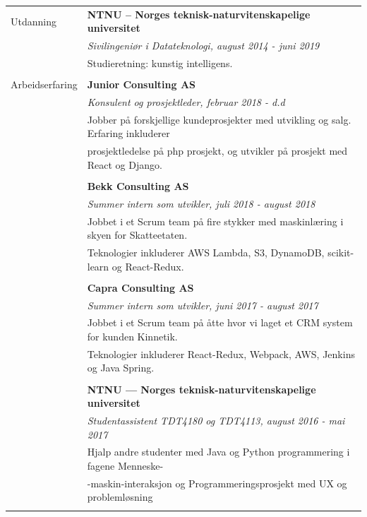 \documentclass[letterpaper,10pt,oneside]{article}
\begin{document}
\noindent \begin{longtable}{@{} l l}
  \Large{Utdanning} & \textbf{NTNU – Norges teknisk-naturvitenskapelige universitet} \\
  & \textit{Sivilingeniør i Datateknologi, august 2014 - juni 2019}\\
     & Studieretning: kunstig intelligens.\\
     & \\
     \Large{Arbeidserfaring} 
     & \textbf{Junior Consulting AS} \\
     & \textit{Konsulent og prosjektleder, februar 2018 - d.d} \\
     & Jobber på forskjellige kundeprosjekter med utvikling og salg. Erfaring inkluderer \\
     & prosjektledelse på php prosjekt, og utvikler på prosjekt med React og Django.\\
     & \\
     & \textbf{Bekk Consulting AS} \\
     & \textit{Summer intern som utvikler, juli 2018 - august 2018} \\
     & Jobbet i et Scrum team på fire stykker med maskinlæring i skyen for Skatteetaten.\\
     & Teknologier inkluderer AWS Lambda, S3, DynamoDB, scikit-learn og React-Redux.\\
     & \\
     & \textbf{Capra Consulting AS} \\
     & \textit{Summer intern som utvikler, juni 2017 - august 2017} \\
     & Jobbet i et Scrum team på åtte hvor vi laget et CRM system for kunden Kinnetik.\\
     & Teknologier inkluderer React-Redux, Webpack, AWS, Jenkins og Java Spring.\\
     & \\
     & \textbf{NTNU --- Norges teknisk-naturvitenskapelige universitet} \\
     & \textit{Studentassistent TDT4180 og TDT4113, august 2016 - mai 2017}\\
     & Hjalp andre studenter med Java og Python programmering i fagene Menneske-\\
     & -maskin-interaksjon og Programmeringsprosjekt med UX og problemløsning\\
     & \\


\end{longtable}
\end{document}
